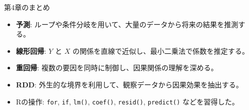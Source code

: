\documentclass[
  ignorenonframetext,
]{beamer}
\providecommand{\tightlist}{%
  \setlength{\itemsep}{0pt}\setlength{\parskip}{0pt}}
\begin{document}
\begin{frame}[fragile]{第4章のまとめ}
\protect\hypertarget{ux7b2c4ux7ae0ux306eux307eux3068ux3081}{}
\begin{itemize}
\tightlist
\item
  \textbf{予測}:
  ループや条件分岐を用いて、大量のデータから将来の結果を推測する。
\item
  \textbf{線形回帰}: \(Y\) と \(X\)
  の関係を直線で近似し、最小二乗法で係数を推定する。
\item
  \textbf{重回帰}: 複数の要因を同時に制御し、因果関係の理解を深める。
\item
  \textbf{RDD}:
  外生的な境界を利用して、観察データから因果効果を抽出する。
\item
  Rの操作: \texttt{for}, \texttt{if}, \texttt{lm()}, \texttt{coef()},
  \texttt{resid()}, \texttt{predict()} などを習得した。
\end{itemize}
\end{frame}
\end{document}
